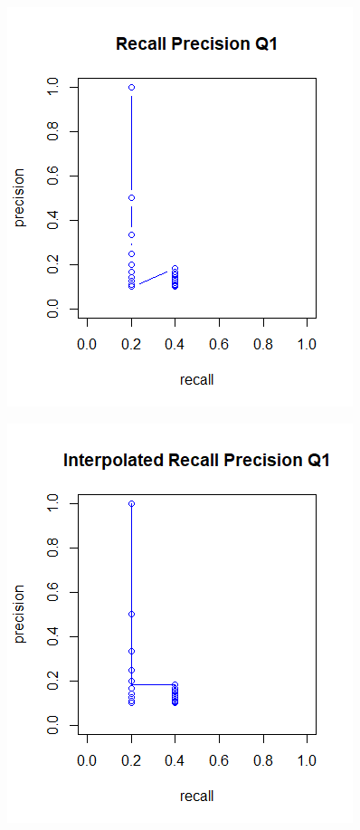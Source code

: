 \documentclass[letterpaper,12pt]{article}
\begin{document}
\begin{figure}
  \includegraphics[width=\linewidth]{84q1uninterpolated.PNG}
  \label{fig:q1uninterpolated}
\end{figure}

\begin{figure}
  \includegraphics[width=\linewidth]{84q1interpolated.PNG}
  \label{fig:q1interpolated}
\end{figure}
\end{document}
